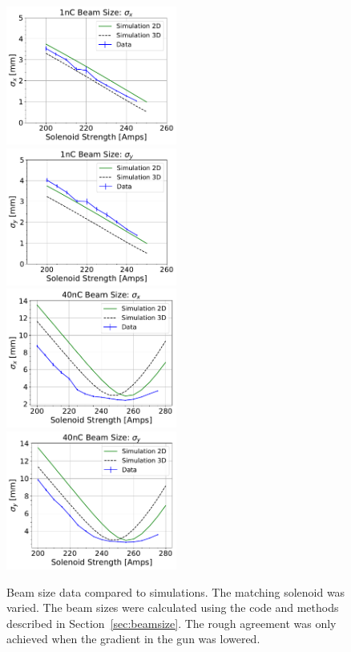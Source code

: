 \begin{figure}
	\centering
	\includegraphics[width=0.5\textwidth]{images/xbeamsizes_low_charge_sol_scan_11-02-2017}%
	\includegraphics[width=0.5\textwidth]{images/ybeamsizes_low_charge_sol_scan_11-02-2017}\\
	\includegraphics[width=0.5\textwidth]{images/xbeamsizes_high_charge_sol_scan_10-17-2017}%
	\includegraphics[width=0.5\textwidth]{images/ybeamsizes_high_charge_sol_scan_10-17-2017}
	\caption{Beam size data compared to simulations. The matching solenoid was varied. 
	The beam sizes were calculated using the code and methods described in Section~\ref{sec:beamsize}. 
	The rough agreement was only achieved when the gradient in the gun was lowered.}
\label{fig:solscan}
\end{figure}


